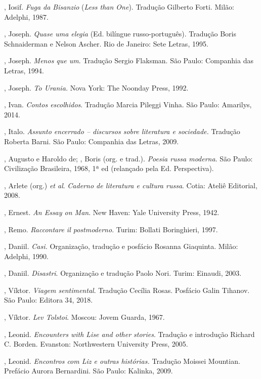 \begin{Parskip}
{, Iosif. \emph{Fuga da Bisanzio} (\emph{Less than One}). Tradução Gilberto Forti. Milão: Adelphi, 1987.

, Joseph. \emph{Quase uma elegia} (Ed. bilíngue russo-português). Tradução Boris Schnaiderman e Nelson Ascher. Rio de Janeiro: Sete Letras, 1995.

, Joseph. \emph{Menos que um}. Tradução Sergio Flaksman. São
Paulo: Companhia das Letras, 1994.

, Joseph. \emph{To Urania.} Nova York: The Noonday Press, 1992.

, Ivan. \emph{Contos escolhidos}. Tradução Marcia Pileggi Vinha. São Paulo: Amarilys, 2014.

, Italo. \emph{Assunto encerrado -- discursos sobre literatura e
sociedade.} Tradução Roberta Barni. São Paulo: Companhia das Letras, 2009.

, Augusto e Haroldo de; , Boris (org. e trad.).
\emph{Poesia russa moderna}. São Paulo: Civilização Brasileira, 1968, 1ª ed (relançado pela Ed. Perspectiva).

, Arlete (org.) \emph{et al}. \emph{Caderno de literatura e cultura
russa}. Cotia: Ateliê Editorial, 2008.

, Ernest. \emph{An Essay on Man}. New Haven: Yale University Press, 1942.

, Remo. \emph{Raccontare il postmoderno}. Turim: Bollati Boringhieri,
1997.

, Daniil. \emph{Casi.} Organização, tradução e posfácio Rosanna
Giaquinta. Milão: Adelphi, 1990.

, Daniil. \emph{Disastri}. Organização e tradução Paolo Nori. Turim: Einaudi, 2003.

, Víktor. \emph{Viagem sentimental}. Tradução Cecília Rosas. Posfácio Galin Tihanov. São Paulo: Editora 34, 2018.

, Víktor. \emph{Lev Tolstoi}. Moscou: Jovem Guarda, 1967.

, Leonid. \emph{Encounters with Lise and other stories}. Tradução e introdução Richard C. Borden. Evanston: Northwestern University Press, 2005.

, Leonid. \emph{Encontros com Liz e outras histórias.} Tradução Moissei Mountian. Prefácio Aurora Bernardini. São Paulo: Kalinka, 2009.

}
\end{Parskip}
